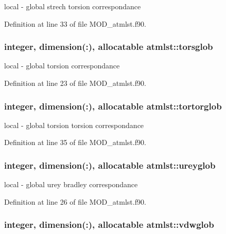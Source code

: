 local -\/ global strech torsion correspondance 



Definition at line 33 of file M\-O\-D\-\_\-atmlst.\-f90.

\hypertarget{classatmlst_a497e40aa26b6dad9191cbaef531576bb}{
\subsubsection[{torsglob}]{\setlength{\rightskip}{0pt plus 5cm}integer, dimension(\-:), allocatable atmlst\-::torsglob}}\label{classatmlst_a497e40aa26b6dad9191cbaef531576bb}


local -\/ global torsion correspondance 



Definition at line 23 of file M\-O\-D\-\_\-atmlst.\-f90.

\hypertarget{classatmlst_aef68f98ee043765bf13b795a34506911}{
\subsubsection[{tortorglob}]{\setlength{\rightskip}{0pt plus 5cm}integer, dimension(\-:), allocatable atmlst\-::tortorglob}}\label{classatmlst_aef68f98ee043765bf13b795a34506911}


local -\/ global torsion torsion correspondance 



Definition at line 35 of file M\-O\-D\-\_\-atmlst.\-f90.

\hypertarget{classatmlst_a3cf834b0b557782383f2506e1e0ea625}{
\subsubsection[{ureyglob}]{\setlength{\rightskip}{0pt plus 5cm}integer, dimension(\-:), allocatable atmlst\-::ureyglob}}\label{classatmlst_a3cf834b0b557782383f2506e1e0ea625}


local -\/ global urey bradley correspondance 



Definition at line 26 of file M\-O\-D\-\_\-atmlst.\-f90.

\hypertarget{classatmlst_aa81ad6da528fd26372d8173d7c5ff4a7}{
\subsubsection[{vdwglob}]{\setlength{\rightskip}{0pt plus 5cm}integer, dimension(\-:), allocatable atmlst\-::vdwglob}}\label{classatmlst_aa81ad6da528fd26372d8173d7c5ff4a7}


